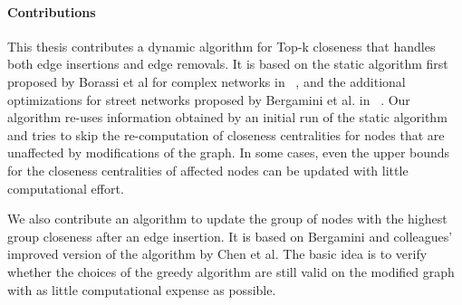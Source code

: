 \paragraph{Contributions}
This thesis contributes a dynamic algorithm for Top-k closeness that handles both edge insertions and edge removals. It is based on the static algorithm first proposed by Borassi et al for complex networks in ~\cite{borassi2015fast}, and the additional optimizations for street networks proposed by Bergamini et al. in ~\cite{bergamini2016computing}. Our algorithm re-uses information obtained by an initial run of the static algorithm and tries to skip the re-computation of closeness centralities for nodes that are unaffected by modifications of the graph. In some cases, even the upper bounds for the closeness centralities of affected nodes can be updated with little computational effort.

We also contribute an algorithm to update the group of nodes with the highest group closeness after an edge insertion. It is based on Bergamini and colleagues' improved version of the algorithm by Chen et al. The basic idea is to verify whether the choices of the greedy algorithm are still valid on the modified graph with as little computational expense as possible.